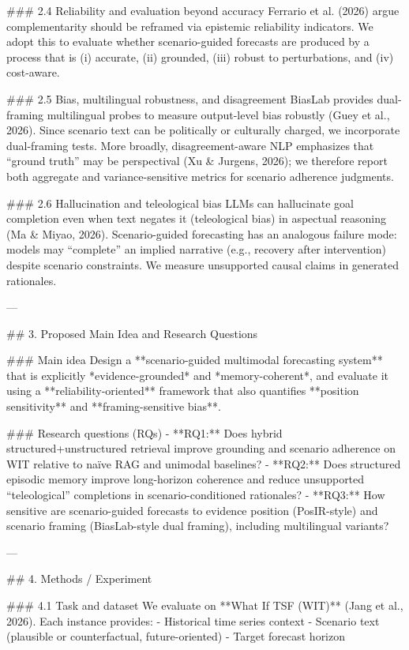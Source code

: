 ### 2.4 Reliability and evaluation beyond accuracy  
Ferrario et al. (2026) argue complementarity should be reframed via epistemic reliability indicators. We adopt this to evaluate whether scenario-guided forecasts are produced by a process that is (i) accurate, (ii) grounded, (iii) robust to perturbations, and (iv) cost-aware.

### 2.5 Bias, multilingual robustness, and disagreement  
BiasLab provides dual-framing multilingual probes to measure output-level bias robustly (Guey et al., 2026). Since scenario text can be politically or culturally charged, we incorporate dual-framing tests. More broadly, disagreement-aware NLP emphasizes that “ground truth” may be perspectival (Xu & Jurgens, 2026); we therefore report both aggregate and variance-sensitive metrics for scenario adherence judgments.

### 2.6 Hallucination and teleological bias  
LLMs can hallucinate goal completion even when text negates it (teleological bias) in aspectual reasoning (Ma & Miyao, 2026). Scenario-guided forecasting has an analogous failure mode: models may “complete” an implied narrative (e.g., recovery after intervention) despite scenario constraints. We measure unsupported causal claims in generated rationales.

---

## 3. Proposed Main Idea and Research Questions  

### Main idea  
Design a **scenario-guided multimodal forecasting system** that is explicitly *evidence-grounded* and *memory-coherent*, and evaluate it using a **reliability-oriented** framework that also quantifies **position sensitivity** and **framing-sensitive bias**.

### Research questions (RQs)  
- **RQ1:** Does hybrid structured+unstructured retrieval improve grounding and scenario adherence on WIT relative to naïve RAG and unimodal baselines?  
- **RQ2:** Does structured episodic memory improve long-horizon coherence and reduce unsupported “teleological” completions in scenario-conditioned rationales?  
- **RQ3:** How sensitive are scenario-guided forecasts to evidence position (PosIR-style) and scenario framing (BiasLab-style dual framing), including multilingual variants?

---

## 4. Methods / Experiment  

### 4.1 Task and dataset  
We evaluate on **What If TSF (WIT)** (Jang et al., 2026). Each instance provides:
- Historical time series context  
- Scenario text (plausible or counterfactual, future-oriented)  
- Target forecast horizon  

